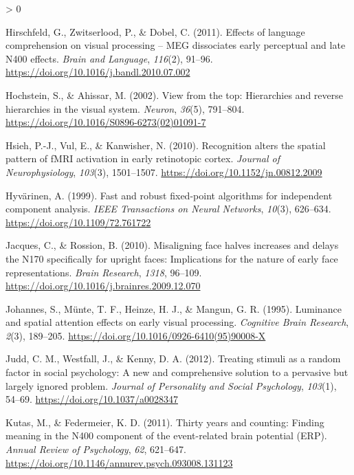 \documentclass[
  english,
  doc,12pt,twoside,floatsintext]{apa7}
\newlength{\cslhangindent}
\newenvironment{CSLReferences}[2] %
 {%
  \setlength{\parindent}{0pt}
  \ifodd #1 \everypar{\setlength{\hangindent}{\cslhangindent}}\ignorespaces\fi
  \ifnum #2 > 0
  \setlength{\parskip}{#2\baselineskip}
  \fi
 }%
 {}
\begin{document}
\begin{CSLReferences}{1}{0}
\leavevmode\hypertarget{ref-hirschfeld2011}{}%
Hirschfeld, G., Zwitserlood, P., \& Dobel, C. (2011). Effects of language comprehension on visual processing -- MEG dissociates early perceptual and late N400 effects. \emph{Brain and Language}, \emph{116}(2), 91--96. \url{https://doi.org/10.1016/j.bandl.2010.07.002}

\leavevmode\hypertarget{ref-hochstein2002}{}%
Hochstein, S., \& Ahissar, M. (2002). View from the top: Hierarchies and reverse hierarchies in the visual system. \emph{Neuron}, \emph{36}(5), 791--804. \url{https://doi.org/10.1016/S0896-6273(02)01091-7}

\leavevmode\hypertarget{ref-hsieh2010}{}%
Hsieh, P.-J., Vul, E., \& Kanwisher, N. (2010). Recognition alters the spatial pattern of {fMRI} activation in early retinotopic cortex. \emph{Journal of Neurophysiology}, \emph{103}(3), 1501--1507. \url{https://doi.org/10.1152/jn.00812.2009}

\leavevmode\hypertarget{ref-hyvuxe4rinen1999}{}%
Hyvärinen, A. (1999). Fast and robust fixed-point algorithms for independent component analysis. \emph{IEEE Transactions on Neural Networks}, \emph{10}(3), 626--634. \url{https://doi.org/10.1109/72.761722}

\leavevmode\hypertarget{ref-jacques2010}{}%
Jacques, C., \& Rossion, B. (2010). Misaligning face halves increases and delays the {N170} specifically for upright faces: Implications for the nature of early face representations. \emph{Brain Research}, \emph{1318}, 96--109. \url{https://doi.org/10.1016/j.brainres.2009.12.070}

\leavevmode\hypertarget{ref-johannes1995}{}%
Johannes, S., Münte, T. F., Heinze, H. J., \& Mangun, G. R. (1995). Luminance and spatial attention effects on early visual processing. \emph{Cognitive Brain Research}, \emph{2}(3), 189--205. \url{https://doi.org/10.1016/0926-6410(95)90008-X}

\leavevmode\hypertarget{ref-judd2012}{}%
Judd, C. M., Westfall, J., \& Kenny, D. A. (2012). Treating stimuli as a random factor in social psychology: A new and comprehensive solution to a pervasive but largely ignored problem. \emph{Journal of Personality and Social Psychology}, \emph{103}(1), 54--69. \url{https://doi.org/10.1037/a0028347}

\leavevmode\hypertarget{ref-kutas2011}{}%
Kutas, M., \& Federmeier, K. D. (2011). Thirty years and counting: Finding meaning in the {N400} component of the event-related brain potential ({ERP}). \emph{Annual Review of Psychology}, \emph{62}, 621--647. \url{https://doi.org/10.1146/annurev.psych.093008.131123}


\end{CSLReferences}
\end{document}
